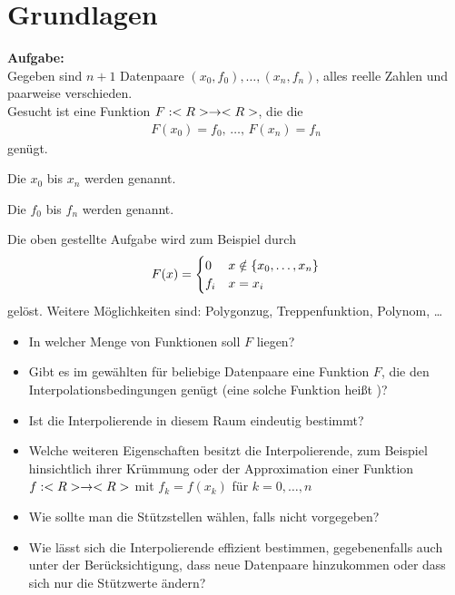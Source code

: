 \section{Grundlagen}

\textbf{Aufgabe:} \\
Gegeben sind $n+1$ Datenpaare $(x_0,f_0),\dots, (x_n,f_n)$, alles reelle Zahlen und paarweise verschieden. \\
Gesucht ist eine Funktion $F:<R>\to<R>$, die die 
\begin{align}
	\label{interpolationsbedingung}
	F(x_0) = f_0, \, \dots, \, F(x_n)=f_n
\end{align}
genügt.

\begin{*definition}
	Die $x_0$ bis $x_n$ werden  genannt.
	
	Die $f_0$ bis $f_n$ werden  genannt.
\end{*definition}

Die oben gestellte Aufgabe wird zum Beispiel durch 
\begin{align}
	F(x) = \begin{cases}
		0 & x\notin \{x_0,\dots,x_n\} \\
		f_i & x=x_i
	\end{cases}\notag
\end{align}
gelöst. Weitere Möglichkeiten sind: Polygonzug, Treppenfunktion, Polynom, \dots
\begin{itemize}
	\item In welcher Menge von Funktionen soll $F$ liegen?
	\item Gibt es im gewählten  für beliebige Datenpaare eine Funktion $F$, die den Interpolationsbedingungen genügt (eine solche Funktion heißt )?
	\item Ist die Interpolierende in diesem Raum eindeutig bestimmt?
	\item Welche weiteren Eigenschaften besitzt die Interpolierende, zum Beispiel hinsichtlich ihrer Krümmung oder der Approximation einer Funktion $f:<R>\to<R>$ mit $f_k=f(x_k)$ für $k=0, \dots, n$
	\item Wie sollte man die Stützstellen wählen, falls nicht vorgegeben?
	\item Wie lässt sich die Interpolierende effizient bestimmen, gegebenenfalls auch unter der Berücksichtigung, dass neue Datenpaare hinzukommen oder dass sich nur die Stützwerte ändern? 
\end{itemize}

